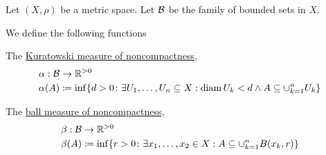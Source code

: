 Let $(X, \rho)$ be a metric space. Let $\mathcal B$ be the family of bounded sets in $X$.

\begin{definition}\label{def:noncompactness_measures}\cite[definition 7.1]{Deimling1985}
  We define the following functions
  \begin{defenum}
    \item\label{def:noncompactness_measures/sets} The \uline{Kuratowski measure of noncompactness},
    \begin{align*}
      &\alpha: \mathcal B \to \mathbb R^{>0} \\
      &\alpha(A) \coloneqq \inf \{d > 0 \colon \exists U_1, \ldots, U_n \subseteq X: \operatorname{diam} {U_k} < d \land A \subseteq \cup_{k=1}^n U_k \}
    \end{align*}

    \item\label{def:noncompactness_measures/balls} The \uline{ball measure of noncompactness},
    \begin{align*}
      &\beta: \mathcal B \to \mathbb R^{>0} \\
      &\beta(A) \coloneqq \inf \{r > 0 \colon \exists x_1, \ldots, x_2 \in X: A \subseteq \cup_{k=1}^n B(x_k, r) \}
    \end{align*}
  \end{defenum}
\end{definition}

